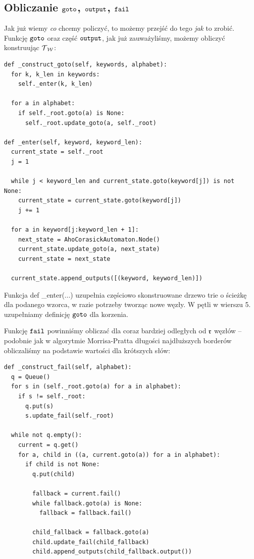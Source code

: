 \subsection{Obliczanie $\operatorname{\texttt{goto}}$, $\operatorname{\texttt{output}}$, $\operatorname{\texttt{fail}}$}
Jak już wiemy \textit{co} chcemy policzyć, to możemy przejść do tego \textit{jak} to zrobić. Funkcję $\operatorname{\texttt{goto}}$ oraz część $\operatorname{\texttt{output}}$, jak już zauważyliśmy, możemy obliczyć konstruując $\operatorname{\mathcal{T}}_{\operatorname{\mathcal{W}}}$:
\begin{verbatim}
def _construct_goto(self, keywords, alphabet):
  for k, k_len in keywords:
    self._enter(k, k_len)

  for a in alphabet:
    if self._root.goto(a) is None:
      self._root.update_goto(a, self._root)

def _enter(self, keyword, keyword_len):
  current_state = self._root
  j = 1

  while j < keyword_len and current_state.goto(keyword[j]) is not None:
    current_state = current_state.goto(keyword[j])
    j += 1

  for a in keyword[j:keyword_len + 1]:
    next_state = AhoCorasickAutomaton.Node()
    current_state.update_goto(a, next_state)
    current_state = next_state

  current_state.append_outputs([(keyword, keyword_len)])
\end{verbatim}

Funkcja def \_enter(...) uzupełnia częściowo skonstruowane drzewo trie o ścieżkę dla podanego wzorca, w razie potrzeby tworząc nowe węzły. W pętli w wierszu 5. uzupełniamy definicję $\operatorname{\texttt{goto}}$ dla korzenia.

\vspace{10pt}

Funkcję $\operatorname{\texttt{fail}}$ powinniśmy obliczać dla coraz bardziej odległych od $\operatorname{\mathfrak{r}}$ węzłów -- podobnie jak w algorytmie Morrisa-Pratta długości najdłuższych borderów obliczaliśmy na podstawie wartości dla krótszych słów:

\begin{verbatim}
def _construct_fail(self, alphabet):
  q = Queue()
  for s in (self._root.goto(a) for a in alphabet):
    if s != self._root:
      q.put(s)
      s.update_fail(self._root)

  while not q.empty():
    current = q.get()
    for a, child in ((a, current.goto(a)) for a in alphabet):
      if child is not None:
        q.put(child)

        fallback = current.fail()
        while fallback.goto(a) is None:
          fallback = fallback.fail()

        child_fallback = fallback.goto(a)
        child.update_fail(child_fallback)
        child.append_outputs(child_fallback.output())
\end{verbatim}

